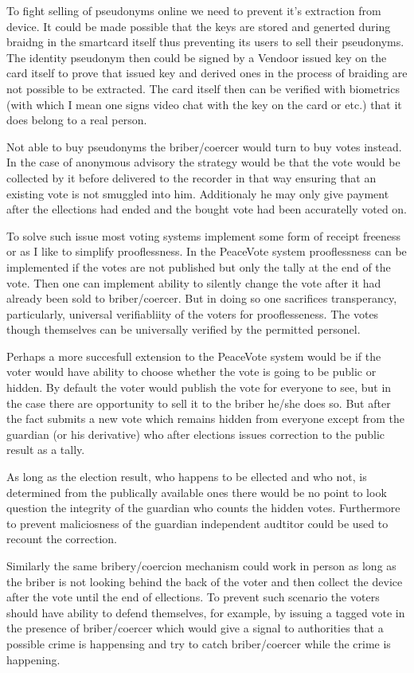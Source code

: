 \documentclass{article}
\begin{document}
To fight selling of pseudonyms online we need to prevent it's extraction from device. It could be made possible that the keys are stored and generted during braidng in the smartcard itself thus preventing its users to sell their pseudonyms. The identity pseudonym then could be signed by a Vendoor issued key on the card itself to prove that issued key and derived ones in the process of braiding are not possible to be extracted. The card itself then can be verified with biometrics (with which I mean one signs video chat with the key on the card or etc.) that it does belong to a real person.

Not able to buy pseudonyms the briber/coercer would turn to buy votes instead. In the case of anonymous advisory the strategy would be that the vote would be collected by it before delivered to the recorder in that way ensuring that an existing vote is not smuggled into him. Additionaly he may only give payment after the ellections had ended and the bought vote had been accuratelly voted on.

To solve such issue most voting systems implement some form of receipt freeness or as I like to simplify prooflessness. In the PeaceVote system prooflessness can be implemented if the votes are not published but only the tally at the end of the vote. Then one can implement ability to silently change the vote after it had already been sold to briber/coercer. But in doing so one sacrifices transperancy, particularly, universal verifiabliity of the voters for prooflesseness. The votes though themselves can be universally verified by the permitted personel.

Perhaps a more succesfull extension to the PeaceVote system would be if the voter would have ability to choose whether the vote is going to be public or hidden. By default the voter would publish the vote for everyone to see, but in the case there are opportunity to sell it to the briber he/she does so. But after the fact submits a new vote which remains hidden from everyone except from the guardian (or his derivative) who after elections issues correction to the public result as a tally.

As long as the election result, who happens to be ellected and who not, is determined from the publically available ones there would be no point to look question the integrity of the guardian who counts the hidden votes. Furthermore to prevent maliciosness of the guardian independent audtitor could be used to recount the correction.

Similarly the same bribery/coercion mechanism could work in person as long as the briber is not looking behind the back of the voter and then collect the device after the vote until the end of ellections. To prevent such scenario the voters should have ability to defend themselves, for example, by issuing a tagged vote in the presence of briber/coercer which would give a signal to authorities that a possible crime is happensing and try to catch briber/coercer while the crime is happening. 
\end{document}
